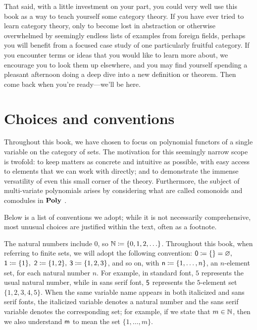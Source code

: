 \documentclass[Book-Poly]{subfiles}
\begin{document}
That said, with a little investment on your part, you could very well use this book as a way to teach yourself some category theory.
If you have ever tried to learn category theory, only to become lost in abstraction or otherwise overwhelmed by seemingly endless lists of examples from foreign fields, perhaps you will benefit from a focused case study of one particularly fruitful category.
If you encounter terms or ideas that you would like to learn more about, we encourage you to look them up elsewhere, and you may find yourself spending a pleasant afternoon doing a deep dive into a new definition or theorem.
Then come back when you're ready---we'll be here.

\section{Choices and conventions}\label{sec.choices}

Throughout this book, we have chosen to focus on polynomial functors of a single variable on the category of sets.
The motivation for this seemingly narrow scope is twofold: to keep matters as concrete and intuitive as possible, with easy access to elements that we can work with directly; and to demonstrate the immense versatility of even this small corner of the theory. Furthermore, the subject of multi-variate polynomials arises by considering what are called comonoids and comodules in $\mathbf{Poly}$ \cite{spivak2023functorial}.


Below is a list of conventions we adopt; while it is not necessarily comprehensive, most unusual choices are justified within the text, often as a footnote.

The natural numbers include $0$, so $\mathbb{N}\coloneqq\{0,1,2,\ldots\}$. Throughout this book, when referring to finite sets, we will adopt the following convention: $\textsf{0}\coloneqq\{\}=\varnothing,$ $\textsf{1}\coloneqq\{1\},$ $\textsf{2}\coloneqq\{1,2\},$ $\textsf{3}\coloneqq\{1,2,3\}$, and so on, with $\mathsf{n}\coloneqq\{1,\ldots,n\}$, an $n$-element set, for each natural number $n$.
For example, in standard font, $5$ represents the usual natural number, while in sans serif font, $\textsf{5}$ represents the $5$-element set $\{1,2,3,4,5\}$.
When the same variable name appears in both italicized and sans serif fonts, the italicized variable denotes a natural number and the sans serif variable denotes the corresponding set; for example, if we state that $m\in\mathbb{N}$, then we also understand $\mathsf{m}$ to mean the set $\{1,\ldots,m\}$.
\end{document}
